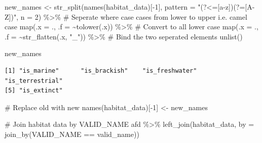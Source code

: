 \documentclass[
  letterpaper,
  DIV=11,
  numbers=noendperiod,
  oneside]{scrreprt}
\newenvironment{Shaded}{\begin{snugshade}}{\end{snugshade}}
\newcommand{\AttributeTok}[1]{\textcolor[rgb]{0.40,0.45,0.13}{#1}}
\newcommand{\CommentTok}[1]{\textcolor[rgb]{0.37,0.37,0.37}{#1}}
\newcommand{\DecValTok}[1]{\textcolor[rgb]{0.68,0.00,0.00}{#1}}
\newcommand{\FunctionTok}[1]{\textcolor[rgb]{0.28,0.35,0.67}{#1}}
\newcommand{\NormalTok}[1]{\textcolor[rgb]{0.00,0.23,0.31}{#1}}
\newcommand{\OtherTok}[1]{\textcolor[rgb]{0.00,0.23,0.31}{#1}}
\newcommand{\SpecialCharTok}[1]{\textcolor[rgb]{0.37,0.37,0.37}{#1}}
\newcommand{\StringTok}[1]{\textcolor[rgb]{0.13,0.47,0.30}{#1}}
\begin{document}
\begin{Shaded}
\begin{Highlighting}[]
\NormalTok{new\_names }\OtherTok{\textless{}{-}} \FunctionTok{str\_split}\NormalTok{(}\FunctionTok{names}\NormalTok{(habitat\_data)[}\SpecialCharTok{{-}}\DecValTok{1}\NormalTok{], }\AttributeTok{pattern =}  \StringTok{"(?\textless{}=[a{-}z])(?=[A{-}Z])"}\NormalTok{, }\AttributeTok{n =} \DecValTok{2}\NormalTok{) }\SpecialCharTok{\%\textgreater{}\%}  \CommentTok{\# Seperate where case cases from lower to upper i.e. camel case}
  \FunctionTok{map}\NormalTok{(}\AttributeTok{.x =}\NormalTok{ ., }
      \AttributeTok{.f =} \SpecialCharTok{\textasciitilde{}}\FunctionTok{tolower}\NormalTok{(.x)) }\SpecialCharTok{\%\textgreater{}\%} \CommentTok{\# Convert to all lower case}
    \FunctionTok{map}\NormalTok{(}\AttributeTok{.x =}\NormalTok{ ., }
      \AttributeTok{.f =} \SpecialCharTok{\textasciitilde{}}\FunctionTok{str\_flatten}\NormalTok{(.x, }\StringTok{"\_"}\NormalTok{)) }\SpecialCharTok{\%\textgreater{}\%}  \CommentTok{\# Bind the two seperated elements}
  \FunctionTok{unlist}\NormalTok{()}
  
\NormalTok{new\_names}
\end{Highlighting}
\end{Shaded}

\begin{verbatim}
[1] "is_marine"      "is_brackish"    "is_freshwater"  "is_terrestrial"
[5] "is_extinct"    
\end{verbatim}

\begin{Shaded}
\begin{Highlighting}[]
\CommentTok{\# Replace old with new}
\FunctionTok{names}\NormalTok{(habitat\_data)[}\SpecialCharTok{{-}}\DecValTok{1}\NormalTok{] }\OtherTok{\textless{}{-}}\NormalTok{ new\_names}

\CommentTok{\# Join habitat data by VALID\_NAME}
\NormalTok{afd }\SpecialCharTok{\%\textgreater{}\%} \FunctionTok{left\_join}\NormalTok{(habitat\_data, }\AttributeTok{by =} \FunctionTok{join\_by}\NormalTok{(VALID\_NAME }\SpecialCharTok{==}\NormalTok{ valid\_name))}
\end{Highlighting}
\end{Shaded}
\end{document}
